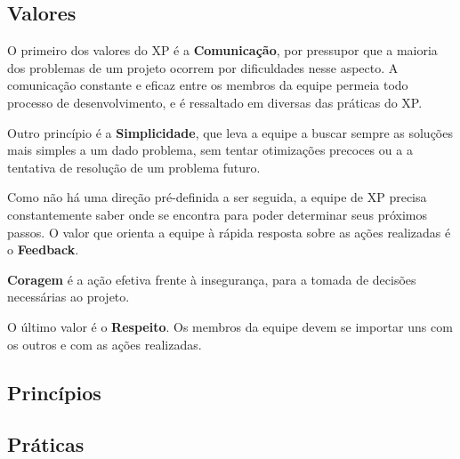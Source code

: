 \documentclass[a4paper,12pt,font=plain,header=plain]{abnt}
\begin{document}
    \subsection{Valores}

      O primeiro dos valores do XP é a \textbf{Comunicação}, por pressupor que a maioria dos problemas de um projeto ocorrem por dificuldades nesse aspecto. A comunicação constante e eficaz entre os membros da equipe permeia todo processo de desenvolvimento, e é ressaltado em diversas das práticas do XP.

      Outro princípio é a \textbf{Simplicidade}, que leva a equipe a buscar sempre as soluções mais simples a um dado problema, sem tentar otimizações precoces ou a a tentativa de resolução de um problema futuro.

      Como não há uma direção pré-definida a ser seguida, a equipe de XP precisa constantemente saber onde se encontra para poder determinar seus próximos passos. O valor que orienta a equipe à rápida resposta sobre as ações realizadas é o \textbf{Feedback}.

      \textbf{Coragem} é a ação efetiva frente à insegurança, para a tomada de decisões necessárias ao projeto.

      O último valor é o \textbf{Respeito}. Os membros da equipe devem se importar uns com os outros e com as ações realizadas.

    \subsection{Princípios}

    \subsection{Práticas}

\end{document}
